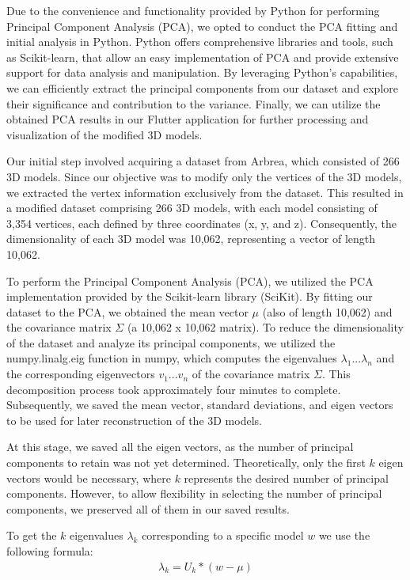 Due to the convenience and functionality provided by Python for performing Principal Component Analysis (PCA), we opted to conduct the PCA fitting and initial analysis in Python. 
Python offers comprehensive libraries and tools, such as Scikit-learn, that allow an easy implementation of PCA and provide extensive support for data analysis and manipulation. 
By leveraging Python's capabilities, we can efficiently extract the principal components from our dataset and explore their significance and contribution to the variance. 
Finally, we can utilize the obtained PCA results in our Flutter application for further processing and visualization of the modified 3D models.

Our initial step involved acquiring a dataset from Arbrea, which consisted of 266 3D models. Since our objective was to modify only the vertices of the 3D models, we extracted the 
vertex information exclusively from the dataset. This resulted in a modified dataset comprising 266 3D models, with each model consisting of 3,354 vertices, each defined by three coordinates (x, y, and z). 
Consequently, the dimensionality of each 3D model was 10,062, representing a vector of length 10,062.

To perform the Principal Component Analysis (PCA), we utilized the PCA implementation provided by the Scikit-learn library (SciKit). By fitting our dataset to the PCA, 
we obtained the mean vector $\mu$ (also of length 10,062) and the covariance matrix $\Sigma$ (a 10,062 x 10,062 matrix). To reduce the dimensionality of the dataset and analyze its principal components, 
we utilized the numpy.linalg.eig function in numpy, which computes the eigenvalues $\lambda_1...\lambda_n$ and the corresponding eigenvectors $v_1...v_n$ of the covariance matrix $\Sigma$. This decomposition process took approximately four minutes to complete. 
Subsequently, we saved the mean vector, standard deviations, and eigen vectors to be used for later reconstruction of the 3D models.

At this stage, we saved all the eigen vectors, as the number of principal components to retain was not yet determined. Theoretically, only the first $k$ eigen vectors would be necessary, 
where $k$ represents the desired number of principal components. However, to allow flexibility in selecting the number of principal components, we preserved all of them in our saved results.

To get the $k$ eigenvalues $\lambda_k$ corresponding to a specific model $w$ we use the following formula: 
\begin{align}\label{eq:lambda_k}
    \lambda_k = U_k * (w - \mu)
\end{align}

